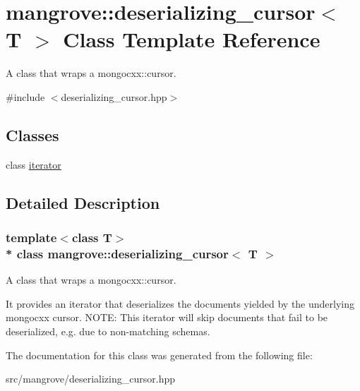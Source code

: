 \hypertarget{classmangrove_1_1deserializing__cursor}{}\section{mangrove\+:\+:deserializing\+\_\+cursor$<$ T $>$ Class Template Reference}
\label{classmangrove_1_1deserializing__cursor}


A class that wraps a mongocxx\+::cursor.  




{\ttfamily \#include $<$deserializing\+\_\+cursor.\+hpp$>$}

\subsection*{Classes}
\begin{DoxyCompactItemize}
\item 
class \hyperlink{classmangrove_1_1deserializing__cursor_1_1iterator}{iterator}
\end{DoxyCompactItemize}


\subsection{Detailed Description}
\subsubsection*{template$<$class T$>$\\*
class mangrove\+::deserializing\+\_\+cursor$<$ T $>$}

A class that wraps a mongocxx\+::cursor. 

It provides an iterator that deserializes the documents yielded by the underlying mongocxx cursor. N\+O\+TE\+: This iterator will skip documents that fail to be deserialized, e.\+g. due to non-\/matching schemas. 

The documentation for this class was generated from the following file\+:\begin{DoxyCompactItemize}
\item 
src/mangrove/deserializing\+\_\+cursor.\+hpp\end{DoxyCompactItemize}
